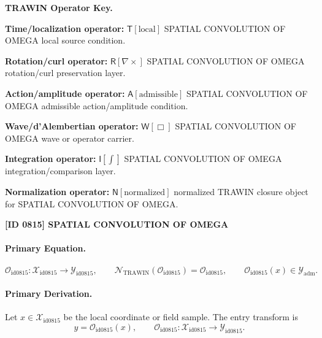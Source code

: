 \par\vspace{0.45\baselineskip}
\noindent\begin{minipage}[t]{\linewidth}
\begingroup
\small
\raggedright
\textbf{TRAWIN Operator Key.}\par
\noindent\textbf{Time/localization operator:} $\mathsf{T}\!\left[\mathrm{local}\right]$ SPATIAL CONVOLUTION OF OMEGA local source condition.\par
\noindent\textbf{Rotation/curl operator:} $\mathsf{R}\!\left[\nabla\times\right]$ SPATIAL CONVOLUTION OF OMEGA rotation/curl preservation layer.\par
\noindent\textbf{Action/amplitude operator:} $\mathsf{A}\!\left[\mathrm{admissible}\right]$ SPATIAL CONVOLUTION OF OMEGA admissible action/amplitude condition.\par
\noindent\textbf{Wave/d'Alembertian operator:} $\mathsf{W}\!\left[\Box\right]$ SPATIAL CONVOLUTION OF OMEGA wave or operator carrier.\par
\noindent\textbf{Integration operator:} $\mathsf{I}\!\left[\int\right]$ SPATIAL CONVOLUTION OF OMEGA integration/comparison layer.\par
\noindent\textbf{Normalization operator:} $\mathsf{N}\!\left[\mathrm{normalized}\right]$ normalized TRAWIN closure object for SPATIAL CONVOLUTION OF OMEGA.\par
\endgroup
\end{minipage}

\clearpage
\noindent\textbf{[ID 0815] SPATIAL CONVOLUTION OF OMEGA}\par
\vspace{0.35em}
\paragraph{Primary Equation.}
\[
\mathcal{O}_{\mathrm{id0815}}:\mathcal{X}_{\mathrm{id0815}}\longrightarrow \mathcal{Y}_{\mathrm{id0815}},\qquad
\mathcal{N}_{\mathrm{TRAWIN}}(\mathcal{O}_{\mathrm{id0815}})=\mathcal{O}_{\mathrm{id0815}},\qquad
\mathcal{O}_{\mathrm{id0815}}(x)\in\mathcal{Y}_{\mathrm{adm}}.
\]

\paragraph{Primary Derivation.} Let $x\in \mathcal{X}_{\mathrm{id0815}}$ be the local coordinate or field sample.  The entry transform is\[
y=\mathcal{O}_{\mathrm{id0815}}(x),\qquad \mathcal{O}_{\mathrm{id0815}}:\mathcal{X}_{\mathrm{id0815}}\longrightarrow \mathcal{Y}_{\mathrm{id0815}}.
\]

